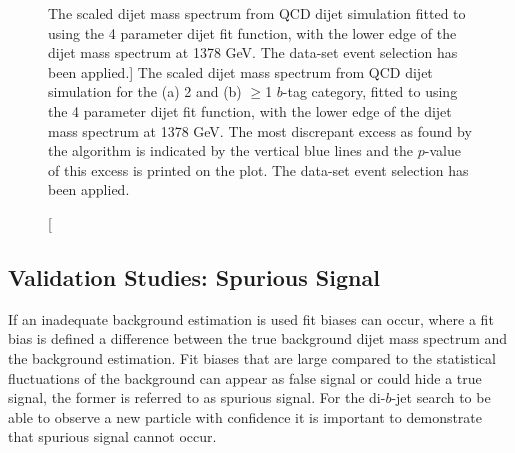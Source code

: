 \begin{figure}[!ht]
  \begin{center}
    \captionsetup[subfigure]{aboveskip=0pt,justification=centering}
  \end{center}
  \vspace{-1em}
  \caption
      [The scaled dijet mass spectrum from QCD dijet simulation
        fitted to using the 4 parameter dijet fit function, with the lower edge of the dijet mass spectrum at 1378 GeV.
        The \summer{} data-set event selection has been applied.]
      { The scaled dijet mass spectrum from QCD dijet simulation for the (a) 2 and (b) $\geq$1 $b$-tag  category,
       fitted to using the 4 parameter dijet fit function, with the lower edge of the dijet mass spectrum at 1378 GeV.
       The most discrepant excess as found by the \bh{} algorithm is indicated by the vertical blue lines and the \mbox{$p$-value} of this excess is printed on the plot.
       The \summer{} data-set event selection has been applied.}
  \label{fig:Short_4para_1378_figure1}
\end{figure}

\FloatBarrier
\subsection{Validation Studies: Spurious Signal}
\label{sec:bkg-summer_spusig}

If an inadequate background estimation is used fit biases can occur,
where a fit bias is defined a difference between the true background
dijet mass spectrum and the background estimation.
Fit biases that are large compared to the statistical fluctuations of the background
can appear as false signal or could hide a true signal, the former is referred to as spurious signal.
For the di-$b$-jet search to be able to observe a new particle with confidence it is
important to demonstrate that spurious signal cannot occur.

